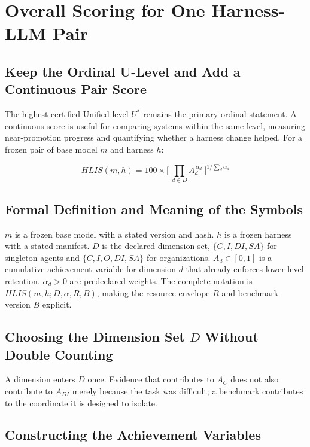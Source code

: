 \documentclass[11pt]{article}
\theoremstyle{definition}
\begin{document}
\section{Overall Scoring for One Harness-LLM Pair}

\subsection{Keep the Ordinal U-Level and Add a Continuous Pair Score}

The highest certified Unified level $U^{*}$ remains the primary ordinal statement. A continuous score is useful for comparing systems within the same level, measuring near-promotion progress and quantifying whether a harness change helped. For a frozen pair of base model $m$ and harness $h$:

\begin{equation}
HLIS(m,h) = 100 \times \Big[\ \prod_{d \in D} A_d^{\,\alpha_d}\ \Big]^{1/\sum_d \alpha_d}
\end{equation}

\subsection{Formal Definition and Meaning of the Symbols}

$m$ is a frozen base model with a stated version and hash. $h$ is a frozen harness with a stated manifest. $D$ is the declared dimension set, $\{C,I,DI,SA\}$ for singleton agents and $\{C,I,O,DI,SA\}$ for organizations. $A_d \in [0,1]$ is a cumulative achievement variable for dimension $d$ that already enforces lower-level retention. $\alpha_d > 0$ are predeclared weights. The complete notation is $HLIS(m,h;D,\alpha,R,B)$, making the resource envelope $R$ and benchmark version $B$ explicit.

\subsection{Choosing the Dimension Set $D$ Without Double Counting}

A dimension enters $D$ once. Evidence that contributes to $A_C$ does not also contribute to $A_{DI}$ merely because the task was difficult; a benchmark contributes to the coordinate it is designed to isolate.

\subsection{Constructing the Achievement Variables}
\end{document}
